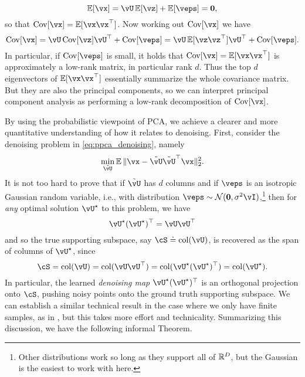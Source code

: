\documentclass[\toplevelprefix/book-main.tex]{subfiles}
\begin{document}
\begin{equation}
    \Ex[\vx] = \vU\Ex[\vz] + \Ex[\veps] = \vzero,
\end{equation}
so that \(\Cov[\vx] = \Ex[\vx\vx^{\top}]\). Now working out \(\Cov[\vx]\) we have 
\begin{equation}
    \Cov[\vx] = \vU\Cov[\vz]\vU^{\top} + \Cov[\veps] = \vU\Ex[\vz\vz^{\top}]\vU^{\top} + \Cov[\veps].
\end{equation}
In particular, if \(\Cov[\veps]\) is small, it holds that \(\Cov[\vx] = \Ex[\vx\vx^{\top}]\) is approximately a low-rank matrix, in particular rank \(d\). Thus the top \(d\) eigenvectors of \(\Ex[\vx\vx^{\top}]\) essentially summarize the whole covariance matrix. But they are also the principal components, so we can interpret principal component analysis as performing a low-rank decomposition of \(\Cov[\vx]\).

\begin{remark}
    By using the probabilistic viewpoint of PCA, we achieve a clearer and more quantitative understanding of how it relates to denoising. First, consider the denoising problem in \eqref{eq:ppca_denoising}, namely
    \begin{equation}
        \min_{\tilde{\vU}}\Ex\norm{\vx - \tilde{\vU}\tilde{\vU}^{\top}\vx}_{2}^{2}.
    \end{equation}
    It is not too hard to prove that if $\tilde{\vU}$ has $d$ columns and if
    \(\veps\) is an isotropic Gaussian
    random variable, i.e., with distribution \(\veps \sim \dNorm(\vzero,
    \sigma^{2}\vI)\),\footnote{Other distributions work so long as they support
    all of \(\mathbb{R}^{D}\), but the Gaussian is the easiest to work with here.} then
    for \textit{any} optimal solution
    \(\vU^{\star}\) to this problem, we have 
    \begin{equation}
        \vU^{\star}(\vU^{\star})^{\top} = \vU\vU^{\top}
    \end{equation}
    and so the true supporting subspace, say \(\cS \doteq \mathop{\mathrm{col}}(\vU)\), is
    recovered as the span of columns of \(\vU^{\star}\), since 
    \begin{equation}
        \cS = \mathop{\mathrm{col}}(\vU) = \mathop{\mathrm{col}}(\vU\vU^{\top})
        = \mathop{\mathrm{col}}(\vU^{\star}(\vU^{\star})^{\top})
        = \mathop{\mathrm{col}}(\vU^{\star}).
    \end{equation}
    In particular, the learned \textit{denoising map} \(\vU^{\star}(\vU^{\star})^{\top}\) is an orthogonal projection onto \(\cS\), pushing noisy points onto the ground truth supporting subspace. We can establish a similar technical result in the case where we only have finite samples, as in , but this takes more effort and technicality. Summarizing this discussion, we have the following informal Theorem.
\end{remark}
\end{document}
